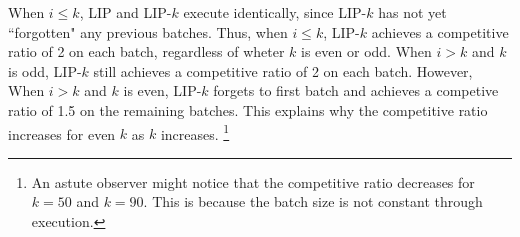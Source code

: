 When $i \leq k$, LIP and LIP-$k$ execute identically, since LIP-$k$ has not yet ``forgotten" any previous batches. 
Thus, when $i \leq k$, LIP-$k$ achieves a competitive ratio of 2 on each batch, regardless of wheter $k$ is even or odd.
When $i > k$ and $k$ is odd, LIP-$k$ still achieves a competitive ratio of 2 on each batch.
However, When $i > k$ and $k$ is even, LIP-$k$ forgets to first batch and achieves a competive ratio of 1.5 on the remaining batches.
This explains why the competitive ratio increases for even $k$ as $k$ increases.
\footnote{An astute observer might notice that the competitive ratio decreases for $k = 50$ and $k = 90$. This is because the batch size is not constant through execution.}


